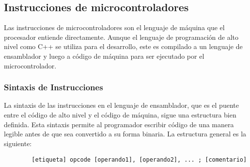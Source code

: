 \documentclass[a4paper,12pt]{article}
\begin{document}
	
	\subsection{Instrucciones de microcontroladores}
	Las instrucciones de microcontroladores son el lenguaje de máquina que el procesador entiende directamente. Aunque el lenguaje de programación de alto nivel como C++ se utiliza para el desarrollo, este es compilado a un lenguaje de ensamblador y luego a código de máquina para ser ejecutado por el microcontrolador.
	
	\subsubsection{Sintaxis de Instrucciones}
	La sintaxis de las instrucciones en el lenguaje de ensamblador, que es el puente entre el código de alto nivel y el código de máquina, sigue una estructura bien definida. Esta sintaxis permite al programador escribir código de una manera legible antes de que sea convertido a su forma binaria. La estructura general es la siguiente:
	
	\begin{verbatim}
		[etiqueta] opcode [operando1], [operando2], ... ; [comentario]
	\end{verbatim}
	
\end{document}
